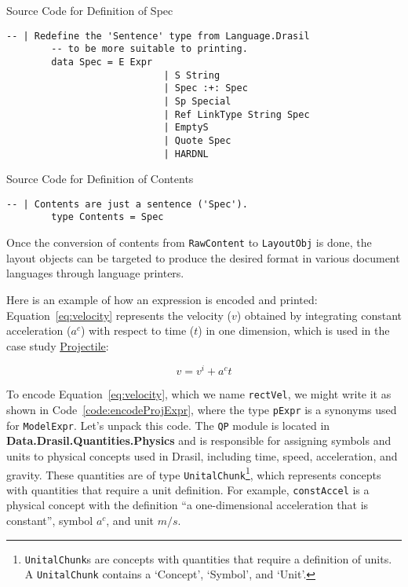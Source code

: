 \begin{listing}[h!]
	\caption{Source Code for Definition of Spec}
	\label{code:Spec}
	\begin{lstlisting}[language=haskell1]
		-- | Redefine the 'Sentence' type from Language.Drasil 
		-- to be more suitable to printing.
		data Spec = E Expr                   
							| S String                
							| Spec :+: Spec          
							| Sp Special              
							| Ref LinkType String Spec 
							| EmptyS                  
							| Quote Spec              
							| HARDNL                 
	\end{lstlisting}
\end{listing}

\begin{listing}[h!]
	\caption{Source Code for Definition of Contents}
	\label{code:Contents}
	\begin{lstlisting}[language=haskell1]
		-- | Contents are just a sentence ('Spec').
		type Contents = Spec       
	\end{lstlisting}
\end{listing}

Once the conversion of contents from \texttt{RawContent} to 
\texttt{LayoutObj} is done, the layout objects can be targeted to 
produce the desired format in various document languages through language 
printers.

Here is an example of how an expression is encoded and printed: 
Equation~\ref{eq:velocity} represents the velocity ($v$) obtained by 
integrating constant acceleration ($a^c$) with respect to time ($t$) in one 
dimension, which is used in the case study 
\href{https://jacquescarette.github.io/Drasil/examples/projectile/SRS/srs/Projectile_SRS.html}{Projectile}:
 
\begin{equation}
	\label{eq:velocity}
	v=v^i+a^ct
\end{equation}

To encode Equation~\ref{eq:velocity}, which we name \texttt{rectVel}, we 
might write it as shown in Code~\ref{code:encodeProjExpr}, where the type 
\texttt{pExpr} is a synonyms used for \texttt{ModelExpr}. Let's unpack this 
code. The \texttt{QP} module is located in 
\textbf{Data.Drasil.Quantities.Physics} and is responsible for assigning 
symbols and units to physical concepts used in Drasil, including time, speed, 
acceleration, and gravity. These quantities are of type 
\texttt{UnitalChunk}\footnote{\texttt{UnitalChunk}s are concepts with 
quantities that require a definition of units. A \texttt{UnitalChunk} contains 
a `Concept', `Symbol', and `Unit'.}, which represents concepts with quantities 
that require a unit definition. For example, \texttt{constAccel} is a physical 
concept with the definition ``a one-dimensional acceleration that is 
constant'', symbol $a^c$, and unit $m/s$.
 
